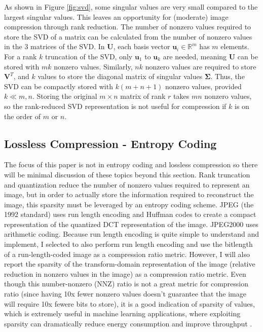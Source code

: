 \documentclass[conference]{IEEEtran}
\begin{document}
As shown in Figure \ref{fig:svd}, some singular values are very small compared to the largest singular values.
This leaves an opportunity for (moderate) image compression through rank reduction.
The number of nonzero values required to store the SVD of a matrix can be calculated from the number of nonzero values in the 3 matrices of the SVD.
In $\mathbf{U}$, each basis vector $\mathbf{u}_i \in \mathbb{R}^m$ has $m$ elements.
For a rank $k$ truncation of the SVD, only $\mathbf{u}_1$ to $\mathbf{u}_k$ are needed, meaning $\mathbf{U}$ can be stored with $mk$ nonzero values.
Similarly, $nk$ nonzero values are required to store $\mathbf{V}^T$, and $k$ values to store the diagonal matrix of singular values $\bm{\Sigma}$.
Thus, the SVD can be compactly stored with $k(m + n + 1)$ nonzero values, provided $k \ll m,n$.
Storing the original $m\times n$ matrix of rank $r$ takes $mn$ nonzero values, so the rank-reduced SVD representation is not useful for compression if $k$ is on the order of $m$ or $n$.

\subsection{Lossless Compression - Entropy Coding}

The focus of this paper is not in entropy coding and lossless compression so there will be minimal discussion of these topics beyond this section.
Rank truncation and quantization reduce the number of nonzero values required to represent an image, but in order to actually store the information required to reconstruct the image, this sparsity must be leveraged by an entropy coding scheme.
JPEG (the 1992 standard) uses run length encoding and Huffman codes to create a compact representation of the quantized DCT representation of the image.
JPEG2000 uses arithmetic coding.
Because run length encoding is quite simple to understand and implement, I selected to also perform run length encoding and use the bitlength of a run-length-coded image as a compression ratio metric.
However, I will also report the sparsity of the transform-domain representation of the image (relative reduction in nonzero values in the image) as a compression ratio metric.
Even though this number-nonzero (NNZ) ratio is not a great metric for compression ratio (since having 10x fewer nonzero values doesn't guarantee that the image will require 10x fewere bits to store), it is a good indication of sparsity of values, which is extremely useful in machine learning applications, where exploiting sparsity can dramatically reduce energy consumption and improve throughput \cite{scnn}.
\end{document}
